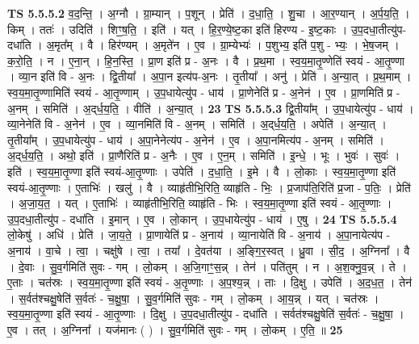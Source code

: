 \documentclass[17pt]{extarticle}
\begin{document}
                  \newline
                                \textbf{ TS 5.5.5.2} \newline
                  व॒द॒न्ति॒ । अ॒ग्नौ । ग्रा॒म्यान् । प॒शून् । प्रेति॑ । द॒धा॒ति॒ । शु॒चा । आ॒र॒ण्यान् । अ॒र्प॒य॒ति॒ । किम् । ततः॑ । उदिति॑ । शिꣳ॒॒ष॒ति॒ । इति॑ । यत् । हि॒र॒ण्ये॒ष्ट॒का इति॑ हिरण्य - इ॒ष्ट॒काः । उ॒प॒दधा॒तीत्यु॑प-दधा॑ति । अ॒मृत᳚म् । वै । हिर॑ण्यम् । अ॒मृते॑न । ए॒व । ग्रा॒म्येभ्यः॑ । प॒शुभ्य॒ इति॑ प॒शु - भ्यः॒ । भे॒ष॒जम् । क॒रो॒ति॒ । न । ए॒ना॒न् । हि॒न॒स्ति॒ । प्रा॒ण इति॑ प्र - अ॒नः । वै । प्र॒थ॒मा । स्व॒य॒मा॒तृ॒ण्णेति॑ स्वयं -  आ॒तृ॒ण्णा । व्या॒न इति॑ वि - अ॒नः । द्वि॒तीया᳚ । अ॒पा॒न इत्य॑प-अ॒नः । तृ॒तीया᳚ । अनु॑ । प्रेति॑ । अ॒न्या॒त् । प्र॒थ॒माम् । स्व॒य॒मा॒तृ॒ण्णामिति॑ स्वयं - आ॒तृ॒ण्णाम् । उ॒प॒धायेत्यु॑प - धाय॑ । प्रा॒णेनेति॑ प्र - अ॒नेन॑ । ए॒व । प्रा॒णमिति॑ प्र - अ॒नम् । समिति॑ । अ॒द्‌र्ध॒य॒ति॒ । वीति॑ । अ॒न्या॒त् । \textbf{  23} \newline
                  \newline
                                \textbf{ TS 5.5.5.3} \newline
                  द्वि॒तीया᳚म् । उ॒प॒धायेत्यु॑प - धाय॑ । व्या॒नेनेति॑ वि - अ॒नेन॑ । ए॒व । व्या॒नमिति॑ वि - अ॒नम् । समिति॑ । अ॒द्‌र्ध॒य॒ति॒ । अपेति॑ । अ॒न्या॒त् । तृ॒तीया᳚म् । उ॒प॒धायेत्यु॑प - धाय॑ । अ॒पा॒नेनेत्य॑प - अ॒नेन॑ । ए॒व । अ॒पा॒नमित्य॑प - अ॒नम् । समिति॑ । अ॒द्‌र्ध॒य॒ति॒ । अथो॒ इति॑ । प्रा॒णैरिति॑ प्र - अ॒नैः । ए॒व । ए॒न॒म् । समिति॑ । इ॒न्धे॒ । भूः । भुवः॑ । सुवः॑ । इति॑ । स्व॒य॒मा॒तृ॒ण्णा इति॑ स्वयं-आ॒तृ॒ण्णाः । उपेति॑ । द॒धा॒ति॒ । इ॒मे । वै । लो॒काः । स्व॒य॒मा॒तृ॒ण्णा इति॑ स्वयं-आ॒तृ॒ण्णाः । ए॒ताभिः॑ । खलु॑ । वै । व्याहृ॑तीभि॒रिति॒ व्याहृ॑ति - भिः॒ । प्र॒जाप॑ति॒रिति॑ प्र॒जा - प॒तिः॒ । प्रेति॑ । अ॒जा॒य॒त॒ । यत् । ए॒ताभिः॑ । व्याहृ॑तीभि॒रिति॒ व्याहृ॑ति - भिः । स्व॒य॒मा॒तृ॒ण्णा इति॑ स्वयं - आ॒तृ॒ण्णाः । उ॒प॒दधा॒तीत्यु॑प - दधा॑ति । इ॒मान् । ए॒व । लो॒कान् । उ॒प॒धायेत्यु॑प - धाय॑ । ए॒षु । \textbf{  24} \newline
                  \newline
                                \textbf{ TS 5.5.5.4} \newline
                  लो॒केषु॑ । अधि॑ । प्रेति॑ । जा॒य॒ते॒ । प्रा॒णायेति॑ प्र - अ॒नाय॑ । व्या॒नायेति॑ वि - अ॒नाय॑ । अ॒पा॒नायेत्य॑प - अ॒नाय॑ । वा॒चे । त्वा॒ । चक्षु॑षे । त्वा॒ । तया᳚ । दे॒वत॑या । अ॒ङ्गि॒र॒स्वत् । ध्रु॒वा । सी॒द॒ । अ॒ग्निना᳚ । वै । दे॒वाः । सु॒व॒र्गमिति॑ सुवः - गम् । लो॒कम् । अ॒जि॒गाꣳ॒॒स॒न्न् । तेन॑ । पति॑तुम् । न । अ॒श॒क्नु॒व॒न्न् । ते । ए॒ताः । चत॑स्रः । स्व॒य॒मा॒तृ॒ण्णा इति॑ स्वयं - अ॒तृ॒ण्णाः । अ॒प॒श्य॒न्न् । ताः । दि॒क्षु । उपेति॑ । अ॒द॒ध॒त॒ । तेन॑ । स॒र्वत॑श्चक्षु॒षेति॑ स॒र्वतः॑ - च॒क्षु॒षा॒ । सु॒व॒र्गमिति॑ सुवः - गम् । लो॒कम् । आ॒य॒न्न् । यत् । चत॑स्रः । स्व॒य॒मा॒तृ॒ण्णा इति॑ स्वयं - आ॒तृ॒ण्णाः । दि॒क्षु । उ॒प॒दधा॒तीत्यु॑प - दधा॑ति । सर्वत॑श्चक्षु॒षेति॑ स॒र्वतः॑ - च॒क्षु॒षा॒ । ए॒व । तत् । अ॒ग्निना᳚ । यज॑मानः ( ) । सु॒व॒र्गमिति॑ सुवः - गम् । लो॒कम् । ए॒ति॒ ॥ \textbf{  25} \newline
\end{document}
